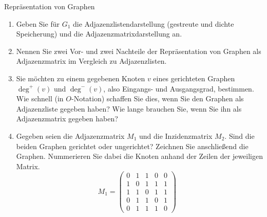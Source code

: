 \documentclass[11pt,a4paper]{article}
\begin{document}
\begin{aufgabe}{1}{Repräsentation von Graphen}
\begin{figure}[h!]
    \end{figure}
    \begin{enumerate}
        \item Geben Sie für $G_1$ die Adjazenzlistendarstellung (gestreute und dichte Speicherung) und die Adjazenzmatrixdarstellung an.
        \item Nennen Sie zwei Vor- und zwei Nachteile der Repräsentation von Graphen als Adjazenzmatrix im Vergleich zu Adjazenzlisten.
        \item Sie möchten zu einem gegebenen Knoten $v$ eines gerichteten Graphen $\operatorname{deg}^+(v)$ und $\operatorname{deg}^-(v)$, also Eingangs- und Ausgangsgrad, bestimmen.
        Wie schnell (in $O$-Notation) schaffen Sie dies, wenn Sie den Graphen als Adjazenzliste gegeben haben?
        Wie lange brauchen Sie, wenn Sie ihn als Adjazenzmatrix gegeben haben?
        \item 
        Gegeben seien die Adjazenzmatrix $M_1$ und die Inzidenzmatrix $M_2$.
        Sind die beiden Graphen gerichtet oder ungerichtet?
        Zeichnen Sie anschließend die Graphen.
        Nummerieren Sie dabei die Knoten anhand der Zeilen der jeweiligen Matrix.
        \begin{equation*}
            M_1 = \begin{pmatrix}
                0 & 1 & 1 & 0 & 0 \\
                1 & 0 & 1 & 1 & 1 \\
                1 & 1 & 0 & 1 & 1 \\
                0 & 1 & 1 & 0 & 1 \\
                0 & 1 & 1 & 1 & 0 
            \end{pmatrix}\,\,\,\,

\end{equation*}
\end{enumerate}
\end{aufgabe}
\end{document}
